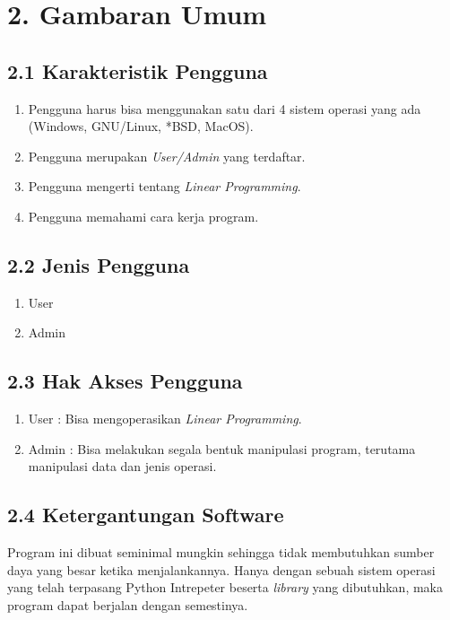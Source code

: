 \documentclass[a4paper]{article}
\begin{document}
\section*{2. Gambaran Umum}
    \subsection*{2.1 Karakteristik Pengguna}
    \begin{enumerate}
        \item Pengguna harus bisa menggunakan satu dari 4 sistem operasi yang ada (Windows, GNU/Linux, *BSD, MacOS).
        \item Pengguna merupakan \textit{User/Admin} yang terdaftar.
        \item Pengguna mengerti tentang \textit{Linear Programming}.
        \item Pengguna memahami cara kerja program.
    \end{enumerate}
    \subsection*{2.2 Jenis Pengguna}
    \begin{enumerate}
        \item User 
        \item Admin
    \end{enumerate}
    \subsection*{2.3 Hak Akses Pengguna}
    \begin{enumerate}
        \item User : Bisa mengoperasikan \textit{Linear Programming}.
        \item Admin : Bisa melakukan segala bentuk manipulasi program, terutama manipulasi data dan jenis operasi.
    \end{enumerate}
    \subsection*{2.4 Ketergantungan Software}
    \noindent Program ini dibuat seminimal mungkin sehingga tidak membutuhkan
    sumber daya yang besar ketika menjalankannya. Hanya dengan sebuah sistem operasi
    yang telah terpasang Python Intrepeter beserta \textit{library} yang 
    dibutuhkan, maka program dapat berjalan dengan semestinya.
\end{document}
